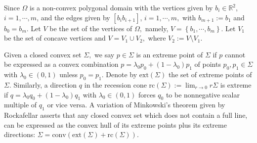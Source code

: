 \documentclass[11pt]{amsart}
\theoremstyle{plain}
\newcommand{\0}{\textbf{0}}
\numberwithin{equation}{section}
\numberwithin{equation}{section}
\numberwithin{figure}{section}
\begin{document}
	Since $\Omega$ is a non-convex polygonal domain with the vertices given by $b_i\in\mathbb{R}^2$, $i=1,\cdots, m$, and the edges given by $[b_ib_{i+1}]$, $i=1, \cdots, m,$ with $b_{m+1}:=b_1$ and $b_0=b_m.$ Let $V$ be the set of the vertices of $\Omega,$ namely, $V=\left\{b_1, \cdots ,b_m\right\}.$ Let $V_1$ be the set of concave vertices and $V=V_1\cup V_2,$ where $V_2:=V\setminus V_1.$
	
	Given a closed convex set $\Sigma,$ we say $p\in \Sigma$ is an extreme point of $\Sigma$ if $p$ cannot be expressed as a convex combination $p=\lambda_0 p_0+(1-\lambda_0) p_1$ of points $p_0,p_1\in \Sigma$ with $\lambda_0\in (0,1)$ unless $p_0=p_1.$ Denote by $\text{ext}(\Sigma)$ the set of extreme points of $\Sigma.$ Similarly, a direction $q$ in the recession cone $\text{rc}(\Sigma):=\lim_{r\rightarrow 0} r \Sigma$ is extreme if $q=\lambda_0 q_0+(1-\lambda_0) q_1$ with $\lambda_0\in (0,1)$ forces $q_0$ to be nonnegative scalar multiple of $q_1$ or vice versa. A variation of Minkowski's theorem given by Rockafellar \cite[Theorem 18.5]{R} asserts that any closed convex set which does not contain a full line, can be expressed as the convex hull of its extreme points plus its extreme directions: $\Sigma =\text{conv} (\text{ext}(\Sigma) + \text{rc}(\Sigma)).$
	
\end{document}
